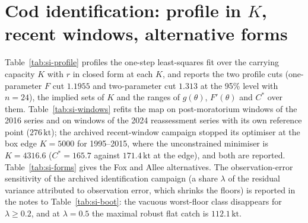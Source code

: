 \documentclass[11pt,a4paper]{article}
\newcommand{\LRP}{\theta}
\newcommand{\Cstar}{C^{*}}
\newcommand{\kt}{\,\mathrm{kt}}
\begin{document}
\section{Cod identification: profile in $K$, recent windows, alternative forms}\label{si:ident}
Table~\ref{tab:si-profile} profiles the one-step least-squares fit over the carrying capacity $K$ with $r$ in closed form at each $K$, and reports the two profile cuts (one-parameter $F$ cut $1.1955$ and two-parameter cut $1.313$ at the 95\% level with $n=24$), the implied sets of $K$ and the ranges of $g(\LRP)$, $F'(\LRP)$ and $\Cstar$ over them. Table~\ref{tab:si-windows} refits the map on post-moratorium windows of the 2016 series and on windows of the 2024 reassessment series with its own reference point ($276\kt$); the archived recent-window campaign stopped its optimiser at the box edge $K=5000$ for 1995--2015, where the unconstrained minimiser is $K=4316.6$ ($\Cstar=165.7$ against $171.4\kt$ at the edge), and both are reported. Table~\ref{tab:si-forms} gives the Fox and Allee alternatives. The observation-error sensitivity of the archived identification campaign (a share $\lambda$ of the residual variance attributed to observation error, which shrinks the floors) is reported in the notes to Table~\ref{tab:si-boot}: the vacuous worst-floor class disappears for $\lambda\ge0.2$, and at $\lambda=0.5$ the maximal robust flat catch is $112.1\kt$.
\end{document}
